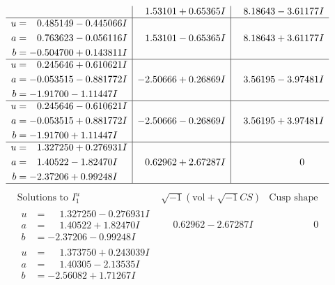 \documentclass[1p]{elsarticle_modified}
\theoremstyle{definition}
\newcommand{\I}{\sqrt{-1}}
\begin{document}
$$\begin{array}{c|c|c}
 & \phantom{-}1.53101 + 0.65365 I & \phantom{-}8.18643 - 3.61177 I \\ \hline\begin{aligned}
u &= \phantom{-}0.485149 - 0.445066 I \\
a &= \phantom{-}0.763623 - 0.056116 I \\
b &= -0.504700 + 0.143811 I\end{aligned}
 & \phantom{-}1.53101 - 0.65365 I & \phantom{-}8.18643 + 3.61177 I \\ \hline\begin{aligned}
u &= \phantom{-}0.245646 + 0.610621 I \\
a &= -0.053515 - 0.881772 I \\
b &= -1.91700 - 1.11447 I\end{aligned}
 & -2.50666 + 0.26869 I & \phantom{-}3.56195 - 3.97481 I \\ \hline\begin{aligned}
u &= \phantom{-}0.245646 - 0.610621 I \\
a &= -0.053515 + 0.881772 I \\
b &= -1.91700 + 1.11447 I\end{aligned}
 & -2.50666 - 0.26869 I & \phantom{-}3.56195 + 3.97481 I \\ \hline\begin{aligned}
u &= \phantom{-}1.327250 + 0.276931 I \\
a &= \phantom{-}1.40522 - 1.82470 I \\
b &= -2.37206 + 0.99248 I\end{aligned}
 & \phantom{-}0.62962 + 2.67287 I & \phantom{-0.000000 } 0\\
 \hline 
 \end{array}$$\newpage$$\begin{array}{c|c|c}  
\text{Solutions to }I^u_{1}& \I (\text{vol} + \sqrt{-1}CS) & \text{Cusp shape}\\
 \hline 
\begin{aligned}
u &= \phantom{-}1.327250 - 0.276931 I \\
a &= \phantom{-}1.40522 + 1.82470 I \\
b &= -2.37206 - 0.99248 I\end{aligned}
 & \phantom{-}0.62962 - 2.67287 I & \phantom{-0.000000 } 0 \\ \hline\begin{aligned}
u &= \phantom{-}1.373750 + 0.243039 I \\
a &= \phantom{-}1.40305 - 2.13535 I \\
b &= -2.56082 + 1.71267 I\end{aligned}

\end{array}$$
\end{document}
